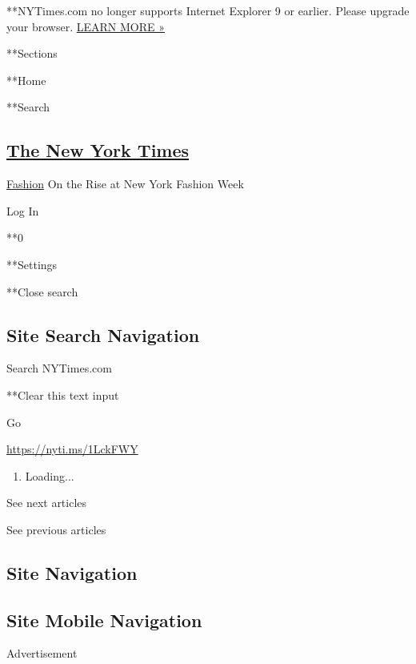  **NYTimes.com no longer supports Internet Explorer 9 or earlier. Please
upgrade your browser.
\href{http://www.nytimes3xbfgragh.onion/content/help/site/ie9-support.html}{LEARN
MORE »}

**Sections

**Home

**Search

\hypertarget{the-new-york-times}{%
\subsection{\texorpdfstring{\href{http://www.nytimes3xbfgragh.onion/}{The
New York Times}}{The New York Times}}\label{the-new-york-times}}

 \href{/section/fashion}{Fashion} \textbar{}On the Rise at New York
Fashion Week

Log In

**0

**Settings

**Close search

\hypertarget{site-search-navigation}{%
\subsection{Site Search Navigation}\label{site-search-navigation}}

Search NYTimes.com

**Clear this text input

Go

\url{https://nyti.ms/1LckFWY}

\begin{enumerate}
\def\labelenumi{\arabic{enumi}.}
\item
  Loading...
\end{enumerate}

See next articles

See previous articles

\hypertarget{site-navigation}{%
\subsection{Site Navigation}\label{site-navigation}}

\hypertarget{site-mobile-navigation}{%
\subsection{Site Mobile Navigation}\label{site-mobile-navigation}}

Advertisement

